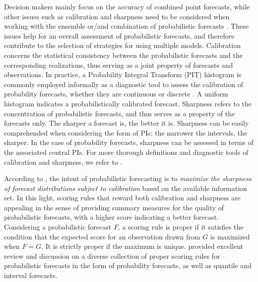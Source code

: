 \documentclass[11pt]{article}
\begin{document}
Decision makers mainly focus on the accuracy of combined point forecasts, while other issues such as calibration and sharpness need to be considered when working with the ensemble or/and combination of probabilistic forecasts \citep{Gneiting2007-fr,Gneiting2007-ij,Lahiri2015-qq}. These issues help for an overall assessment of probabilistic forecasts, and therefore contribute to the selection of strategies for using multiple models. Calibration concerns the statistical consistency between the probabilistic forecasts and the corresponding realizations, thus serving as a joint property of forecasts and observations. In practice, a Probability Integral Transform (PIT) histogram is commonly employed informally as a diagnostic tool to assess the calibration of probability forecasts, whether they are continuous \citep{Dawid1984-vp,Diebold1997-cr} or discrete \citep{Gneiting2013-hl}. A uniform histogram indicates a probabilistically calibrated forecast. Sharpness refers to the concentration of probabilistic forecasts, and thus serves as a property of the forecasts only. The sharper a forecast is, the better it is. Sharpness can be easily comprehended when considering the form of PIs: the narrower the intervals, the sharper. In the case of probability forecasts, sharpness can be assessed in terms of the associated central PIs. For more thorough definitions and diagnostic tools of calibration and sharpness, we refer to \cite{Gneiting2014-tz}.

According to \cite{Gneiting2007-fr}, the intent of probabilistic forecasting is to \textit{maximize the sharpness of forecast distributions subject to calibration} based on the available information set. In this light, scoring rules that reward both calibration and sharpness are appealing in the sense of providing summary measures for the quality of probabilistic forecasts, with a higher score indicating a better forecast. Considering a probabilistic forecast $F$, a scoring rule is proper if it satisfies the condition that the expected score for an observation drawn from $G$ is maximized when $F=G$. It is strictly proper if the maximum is unique. \cite{Gneiting2007-ij} provided excellent review and discussion on a diverse collection of proper scoring rules for probabilistic forecasts in the form of probability forecasts, as well as quantile and interval forecasts.
\end{document}
